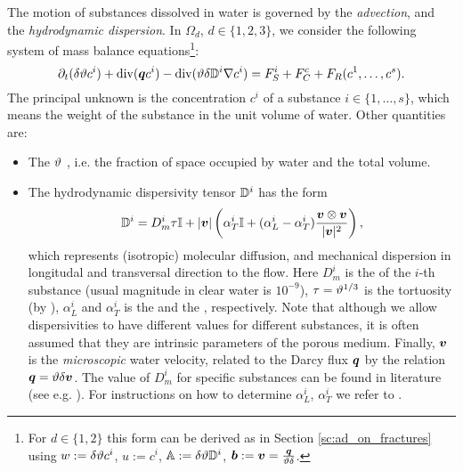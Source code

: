 The motion of substances dissolved in water is governed by the \emph{advection}, and the \emph{hydrodynamic dispersion}.
In $\Omega_d$, $d\in\{1,2,3\}$, we consider the following system of mass balance equations\footnote{For $d\in\{1,2\}$ this form can be derived as in Section \ref{sc:ad_on_fractures} using $w:=\delta\vartheta c^i$, $u:=c^i$, ${\mathbb{A}}:=\delta\vartheta{\mathbb{D}}^i$, $\mathbf{\boldsymbol{b}}:=\mathbf{\boldsymbol{v}}=\frac{\mathbf{\boldsymbol{q}}}{\vartheta\delta}$.}:
\begin{equation}
    \label{e:ADE}
   \partial_t ( \delta \th c^i) + \div ( \vc q c^i ) - \div (\th \delta \D^i \grad c^i ) = F_S^i + F^c_C + F_R(c^1,\dots, c^s).
\end{equation}
The principal unknown is the concentration $c^i$  of a substance $i\in\{1,\dots, s\}$, which means the weight of the substance in the unit volume of water.
Other quantities are:
\begin{itemize}
\item The  $\vartheta$ \units{}{}{}, i.e. the fraction of space occupied by water and the total volume.
\item The hydrodynamic dispersivity tensor ${{\mathbb{D}}}^i$  has the form
\begin{equation} 
  \label{eqn:transport_disp}
  \D^i =D_m^i \tau \tn I + \abs{\vc v}\left(\alpha_T^i \tn I + (\alpha_L^i - \alpha_T^i) \frac{\vc v \otimes \vc v}{\abs{\vc v}^2}\right),
\end{equation}
which represents (isotropic) molecular diffusion, and mechanical dispersion in longitudal and transversal direction to the flow.
Here $D_m^i$  is the  of the $i$-th substance (usual magnitude in clear water is $10^{-9}$), $\tau=\vartheta^{1/3}$ is the tortuosity (by \cite{millington_quirk}), $\alpha_L^i$  and $\alpha_T^i$  is the  and the , respectively.
Note that although we allow dispersivities to have different values for different substances, it is often assumed that they are intrinsic parameters of the porous medium.
Finally, $\mathbf{\boldsymbol{v}}$  is the \emph{microscopic} water velocity, related to the Darcy flux $\mathbf{\boldsymbol{q}}$ by the relation $\mathbf{\boldsymbol{q}} = \vartheta\delta\mathbf{\boldsymbol{v}}$.
The value of $D_m^i$ for specific substances can be found in literature (see e.g. \cite{cislerova_vogel}).
For instructions on how to determine $\alpha_L^i$, $\alpha_T^i$ we refer to \cite{marsily,domenico_schwartz}.


\end{itemize}
